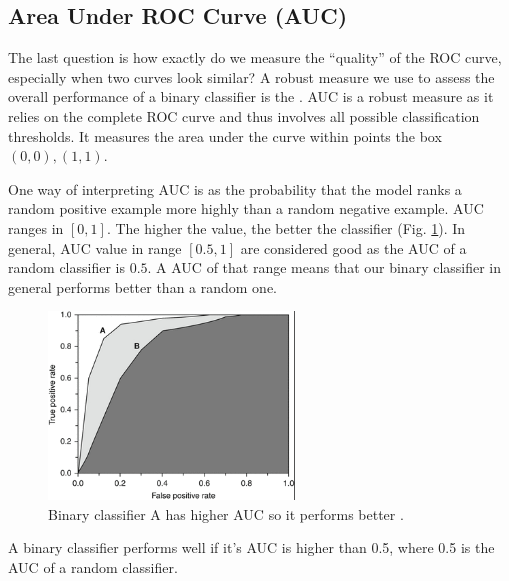 \documentclass[a4paper]{article}
\begin{document}
\subsection{Area Under ROC Curve (AUC)}

The last question is how exactly do we measure the ``quality'' of the ROC curve, especially when two curves look similar? A robust  measure we use to assess the overall performance of a binary classifier is the . AUC is a robust measure as it relies on the complete ROC curve and thus involves all possible classification thresholds. It measures the area under the curve within points the box $(0,0),(1,1)$.

One way of interpreting AUC is as the probability that the model ranks a random positive example more highly than a random negative example. AUC ranges in $[0,1]$. The higher the value, the better the classifier (Fig. \ref{fig:auc_a_vs_b}). In general, AUC value in range $[0.5,1]$ are considered good as the AUC of a random classifier is $0.5$. A AUC of that range means that our binary classifier in general performs better than a random one.
\begin{figure}[H]
    \centering
    \includegraphics[height=5cm]{img/auc_of_a_vs_b.PNG}
    \caption{Binary classifier A has higher AUC so it performs better \cite{Melo2013}.}
    \label{fig:auc_a_vs_b}
\end{figure}

\begin{corollary}
A binary classifier performs well if it's AUC is higher than 0.5, where 0.5 is the AUC of a random classifier.
\end{corollary}



\end{document}
